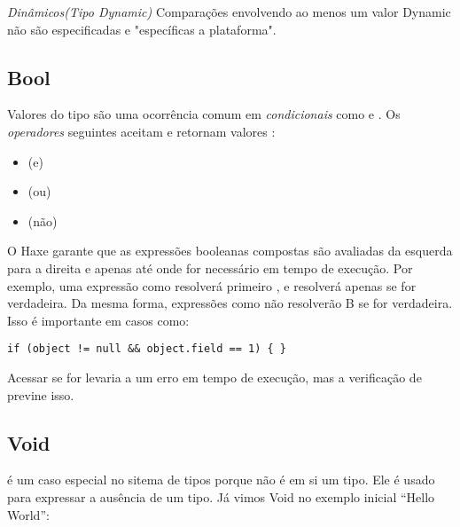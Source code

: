 \emph{Dinâmicos(Tipo Dynamic)}
Comparações envolvendo ao menos um valor Dynamic não são especificadas e "específicas a plataforma".

\subsection{Bool}
\label{types-bool}


Valores do tipo  são uma ocorrência comum em \emph{condicionais} como  e . Os \emph{operadores} seguintes aceitam e retornam valores :

\begin{itemize}
    \item \expr{\&\&} (e)
	\item \expr{||} (ou)
	\item \expr{!} (não)
\end{itemize}

O Haxe garante que as expressões booleanas compostas são avaliadas da esquerda para a direita e apenas até onde for necessário em tempo de execução. Por exemplo, uma expressão como resolverá primeiro , e resolverá  apenas se  for verdadeira. Da mesma forma, expressões como  não resolverão B se  for verdadeira. Isso é importante em casos como:

\begin{lstlisting}
if (object != null && object.field == 1) { }
\end{lstlisting}

Acessar  se  for  levaria a um erro em tempo de execução, mas a verificação de  previne isso.




\subsection{Void}
\label{types-void}


 é um caso especial no sitema de tipos porque não é em si um tipo. Ele é usado para expressar a ausência de um tipo. Já vimos Void no exemplo inicial ``Hello World'':

